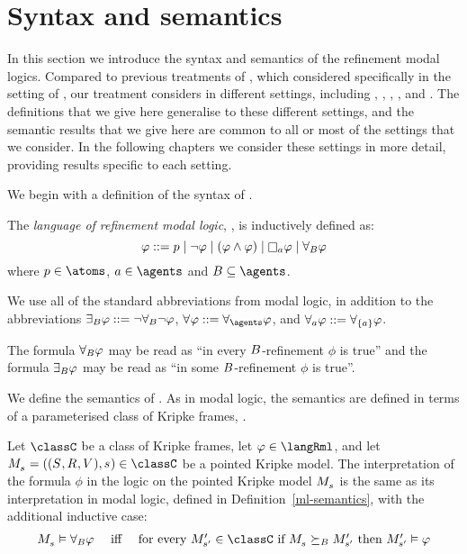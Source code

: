 \section{Syntax and semantics}\label{rml-semantics}

In this section we introduce the syntax and semantics of the refinement modal logics.
Compared to previous treatments of \logicRml{}, which considered \logicRml{} specifically in the setting of \classK{}, our treatment considers \logicRml{} in different settings, including \classK{}, \classKFF{}, \classKD{}, \classS{}, and \classKF{}.
The definitions that we give here generalise to these different settings, and the semantic results that we give here are common to all or most of the settings that we consider.
In the following chapters we consider these settings in more detail, providing results specific to each setting.

\pagebreak

We begin with a definition of the syntax of \logicRml{}.

\begin{definition}
The {\em language of refinement modal logic}, \langRml{}, is inductively defined as:
$$
\phi ::= 
    \atomP \mid
    \lnot \phi \mid
    (\phi \land \phi) \mid
    \necessaryA \phi \mid
    \allrefsBs \phi
$$
where $\atomP \in \atoms$, $\agentA \in \agents$ and $\agentsB \subseteq \agents$.
\end{definition}

We use all of the standard abbreviations from modal logic, in addition to the abbreviations $\somerefsBs \phi ::= \lnot \allrefsBs \lnot \phi$, $\allrefs \phi ::= \allrefsAs \phi$, and $\allrefsA \phi ::= \allrefs[\{\agentA\}] \phi$.

The formula $\allrefsBs \phi$ may be read as ``in every $\agentsB$-refinement $\phi$ is true'' and the formula $\somerefsBs \phi$ may be read as ``in some $\agentsB$-refinement $\phi$ is true''.

We define the semantics of \logicRml{}.
As in modal logic, the semantics are defined in terms of a parameterised class of Kripke frames, \classC{}.

\begin{definition}
Let $\classC$ be a class of Kripke frames, let $\phi \in \langRml$, and let $\kPModelAndTuple{\kStateS} \in \classC$ be a pointed Kripke model.
The interpretation of the formula $\phi$ in the logic \logicRmlC{} on the pointed Kripke model $\kPModel{\kStateS}$ is the same as its interpretation in modal logic, defined in Definition~\ref{ml-semantics}, with the additional inductive case:
$$
\begin{array}{lcl}
    \kPModel{\kStateS} \entails \allrefsBs \phi & \text{ iff } & \text{for every } \kPModelP{\kStateSP} \in \classC \text{ if } \kPModel{\kStateS} \simulatesBs \kPModelP{\kStateSP} \text{ then } \kPModelP{\kStateSP} \entails \phi
\end{array}
$$
\end{definition}

